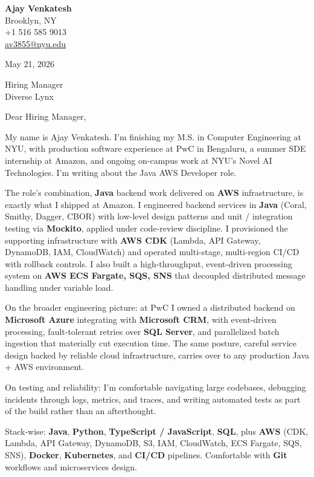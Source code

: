 \documentclass[letterpaper,11pt]{article}
\begin{document}
\begin{flushleft}
\textbf{\large Ajay Venkatesh} \\
Brooklyn, NY \\
+1 516 585 9013 \\
\href{mailto:av3855@nyu.edu}{av3855@nyu.edu}
\end{flushleft}
\vspace{10pt}
May 21, 2026
\vspace{6pt}

Hiring Manager \\
Diverse Lynx

\vspace{10pt}

Dear Hiring Manager,

My name is Ajay Venkatesh. I'm finishing my M.S. in Computer Engineering at NYU, with production software experience at PwC in Bengaluru, a summer SDE internship at Amazon, and ongoing on-campus work at NYU's Novel AI Technologies. I'm writing about the Java AWS Developer role.

The role's combination, \textbf{Java} backend work delivered on \textbf{AWS} infrastructure, is exactly what I shipped at Amazon. I engineered backend services in \textbf{Java} (Coral, Smithy, Dagger, CBOR) with low-level design patterns and unit / integration testing via \textbf{Mockito}, applied under code-review discipline. I provisioned the supporting infrastructure with \textbf{AWS CDK} (Lambda, API Gateway, DynamoDB, IAM, CloudWatch) and operated multi-stage, multi-region CI/CD with rollback controls. I also built a high-throughput, event-driven processing system on \textbf{AWS ECS Fargate, SQS, SNS} that decoupled distributed message handling under variable load.

On the broader engineering picture: at PwC I owned a distributed backend on \textbf{Microsoft Azure} integrating with \textbf{Microsoft CRM}, with event-driven processing, fault-tolerant retries over \textbf{SQL Server}, and parallelized batch ingestion that materially cut execution time. The same posture, careful service design backed by reliable cloud infrastructure, carries over to any production Java + AWS environment.

On testing and reliability: I'm comfortable navigating large codebases, debugging incidents through logs, metrics, and traces, and writing automated tests as part of the build rather than an afterthought.

Stack-wise: \textbf{Java}, \textbf{Python}, \textbf{TypeScript / JavaScript}, \textbf{SQL}, plus \textbf{AWS} (CDK, Lambda, API Gateway, DynamoDB, S3, IAM, CloudWatch, ECS Fargate, SQS, SNS), \textbf{Docker}, \textbf{Kubernetes}, and \textbf{CI/CD} pipelines. Comfortable with \textbf{Git} workflows and microservices design.
\end{document}
